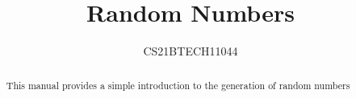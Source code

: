 \documentclass[journal,12pt,twocolumn]{IEEEtran}
\renewcommand\thesection{\arabic{section}}
\begin{document}
\newcommand{\define}{\stackrel{\triangle}{=}}


%

\providecommand{\nCr}[2]{\,^{#1}C_{#2}} %
\providecommand{\nPr}[2]{\,^{#1}P_{#2}} %
\providecommand{\mbf}{\mathbf}
\providecommand{\pr}[1]{\ensuremath{\Pr\left(#1\right)}}
\providecommand{\brak}[1]{\ensuremath{\left(#1\right)}}
\providecommand{\qfunc}[1]{\ensuremath{Q\left(#1\right)}}
\providecommand{\sbrak}[1]{\ensuremath{{}\left[#1\right]}}
\providecommand{\lsbrak}[1]{\ensuremath{{}\left[#1\right.}}
\providecommand{\rsbrak}[1]{\ensuremath{{}\left.#1\right]}}
\providecommand{\brak}[1]{\ensuremath{\left(#1\right)}}
\providecommand{\lbrak}[1]{\ensuremath{\left(#1\right.}}
\providecommand{\rbrak}[1]{\ensuremath{\left.#1\right)}}
\providecommand{\cbrak}[1]{\ensuremath{\left\{#1\right\}}}
\providecommand{\lcbrak}[1]{\ensuremath{\left\{#1\right.}}
\providecommand{\rcbrak}[1]{\ensuremath{\left.#1\right\}}}

\providecommand{\system}[1]{\overset{\mathcal{#1}}{ \longleftrightarrow}}
\providecommand{\gauss}[2]{\mathcal{N}\ensuremath{\left(#1,#2\right)}}

\newcommand{\solution}{\noindent \textbf{Solution: }}
\newcommand{\myvec}[1]{\ensuremath{\begin{pmatrix}#1\end{pmatrix}}}
\providecommand{\dec}[2]{\ensuremath{\overset{#1}{\underset{#2}{\gtrless}}}}
\DeclarePairedDelimiter{\ceil}{\lceil}{\rceil}
\makeatletter
{}
\makeatother

\let\StandardTheFigure\thefigure
\renewcommand{\thefigure}{\thesection}
\makeatletter
{}
\makeatother

\let\StandardTheFigure\thefigure
\let\StandardTheTable\thetable
\let\vec\mathbf
{}
\title{Random Numbers}
\author{CS21BTECH11044}
\maketitle

\tableofcontents

\bigskip

\renewcommand{\thefigure}{\theenumi}
\renewcommand{\thetable}{\theenumi}

\begin{abstract}
This manual provides a simple introduction to the generation of random numbers
\end{abstract}
\end{document}

